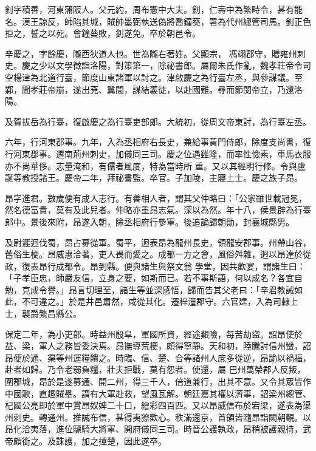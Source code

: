 \begin{pinyinscope}
 釗字積善，河東蒲阪人。父元約，周布憲中大夫。釗，仁壽中為繁畤令，甚有能名。漢王諒反，師陷其城，賊帥墨弼執送偽將喬鐘葵，署為代州總管司馬。釗正色拒之，誓之以死。會鐘葵敗，釗遂免。卒於朝邑令。



 辛慶之，字餘慶，隴西狄道人也。世為隴右著姓。父顯宗，
 馮翊郡守，贈雍州刺史。慶之少以文學徵詣洛陽，對策第一，除祕書郎。屬爾朱氏作亂，魏孝莊帝令司空楊津為北道行臺，節度山東諸軍以討之。津啟慶之為行臺左丞，與參謀議。至鄴，聞孝莊帝崩，遂出兗、冀間，謀結義徒，以赴國難。尋而節閔帝立，乃還洛陽。



 及賀拔岳為行臺，復啟慶之為行臺吏部郎。大統初，從周文帝東討，為行臺左丞。



 六年，行河東郡事。九年，入為丞相府右長史，兼給事黃門侍郎，除度支尚書，復行河東郡事。遷南荊州刺史，加儀同三司。慶之位遇雖隆，而率性儉素，車馬衣服亦不尚華侈。志量淹和，有儒者風度，特為當時所
 重。又以其經明行修。令與盧誕等教授諸王。慶帝二年，拜祕書監。卒官。子加陵，主寢上士。慶之族子昂。



 昂字進君。數歲便有成人志行。有善相人者，謂其父仲略曰：「公家雖世載冠冕，然名德富貴，莫有及此兒者。仲略亦重昂志氣。深以為然。年十八，侯景辟為行臺郎中。景後來附，昂遂入朝，除丞相府行參軍。後追論歸朝勛，封襄城縣男。



 及尉遲迥伐蜀，昂占募從軍。蜀平，迥表昂為龍州長史，領龍安郡事。州帶山谷，舊俗生梗。昂威惠洽著，吏人畏而愛之。成都一方之會，風俗舛雜，迥以昂達於從政，復表昂行成都令。昂到縣。便與諸生與祭文翁
 學堂，因共歡宴，謂諸生曰：「子孝臣忠，師嚴友信，立身之要，如斯而已。若不事斯語，何以成名？各宜自勉，克成令譽。」昂言切理至，諸生等並深感悟，歸而告其父老曰：「辛君教誡如此，不可違之。」於是井邑肅然，咸從其化。遷梓潼郡守。六官建，入為司隸上士，襲爵繁昌縣公。



 保定二年，為小吏部。時益州殷阜，軍國所資，經途艱險，每苦劫盜。詔昂使於益、梁，軍人之務皆委決焉。昂撫導荒梗，頗得寧靜。天和初，陸騰討信州蠻，詔昂便於通、渠等州運糧饋之。時臨、信、楚、合等諸州人庶多從逆，昂諭以禍福，赴者如歸。乃令老弱負糧，壯夫拒戰，莫有怨者。使還，屬
 巴州萬榮郡人反叛，圍郡城，昂於是遂募通、開二州，得三千人，倍道兼行，出其不意。又令其眾皆作中國歌，直趣賊壘。謂有大軍赴救，望風瓦解。朝廷嘉其權以濟事，詔梁州總管、杞國公亮即於軍中賞昂奴婢二十口，繒彩四百匹。又以昂威信布於宕梁，遂表為渠州刺史。轉通州。推誠布信，甚得夷獠歡心。秩滿還京，首領皆隨昂詣闕朝覲。以昂化洽夷落，進位驃騎大將軍、開府儀同三司。時晉公護執政，昂稍被護親待，武帝頗銜之。及誅護，加之捶楚，因此遂卒。




\end{pinyinscope}
